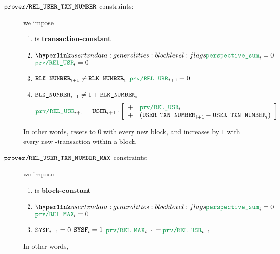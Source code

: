 \begin{description}
        \item[$\texttt{prover\texttt{/}REL\_\texttt{USER}\texttt{\_}\texttt{TXN\_NUMBER}} {}$ constraints:]
                we impose
                \begin{enumerate}
                        \item \proverColB{} is \textbf{transaction-constant}
                        \item \If $\perspectiveSum _{i} = 0$ \Then $\proverColB _{i} = 0$
                        \item \If $\texttt{BLK\_NUMBER} _{i + 1} \neq     \texttt{BLK\_NUMBER} _{i}$ \Then $\proverColB _{i + 1} = 0$
                        \item \If $\texttt{BLK\_NUMBER} _{i + 1} \neq 1 + \texttt{BLK\_NUMBER} _{i}$ \Then
                                \[
                                        \proverColB _{i + 1}
                                        =
                                        \user _{i + 1} \cdot
                                        \left[ \begin{array}{cl}
                                                + & \proverColB _{i}                                                \\
                                                + & (\userTransactionNumber _{i + 1} - \userTransactionNumber _{i}) \\
                                        \end{array} \right]
                                \]
                \end{enumerate}
                \saNote{}
                In other words,
                \proverColB{} resets to $0$ with every new block,
                and increases by $1$ with every new \user{}-transaction
                within a block.
        \item[$\texttt{prover\texttt{/}REL\_\texttt{USER}\texttt{\_}\texttt{TXN\_NUMBER}\_MAX} {}$ constraints:]
                we impose
                \begin{enumerate}
                        \item \proverColC{} is \textbf{block-constant}
                        \item \If $\perspectiveSum _{i} = 0$ \Then $\proverColC _{i} = 0$
                        \item \If $\texttt{SYSF} _{i - 1} = 0$ \et $\texttt{SYSF} _{i} = 1$ \Then $\proverColC _{i - 1} = \proverColB _{i - 1}$
                \end{enumerate}
                \saNote{}
                In other words,

\end{description}
